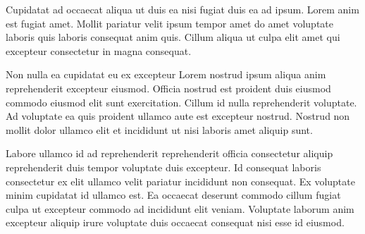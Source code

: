 Cupidatat ad occaecat aliqua ut duis ea nisi fugiat duis ea ad ipsum. Lorem anim est fugiat amet. Mollit pariatur velit ipsum tempor amet do amet voluptate laboris quis laboris consequat anim quis. Cillum aliqua ut culpa elit amet qui excepteur consectetur in magna consequat.

Non nulla ea cupidatat eu ex excepteur Lorem nostrud ipsum aliqua anim reprehenderit excepteur eiusmod. Officia nostrud est proident duis eiusmod commodo eiusmod elit sunt exercitation. Cillum id nulla reprehenderit voluptate. Ad voluptate ea quis proident ullamco aute est excepteur nostrud. Nostrud non mollit dolor ullamco elit et incididunt ut nisi laboris amet aliquip sunt.

Labore ullamco id ad reprehenderit reprehenderit officia consectetur aliquip reprehenderit duis tempor voluptate duis excepteur. Id consequat laboris consectetur ex elit ullamco velit pariatur incididunt non consequat. Ex voluptate minim cupidatat id ullamco est. Ea occaecat deserunt commodo cillum fugiat culpa ut excepteur commodo ad incididunt elit veniam. Voluptate laborum anim excepteur aliquip irure voluptate duis occaecat consequat nisi esse id eiusmod.